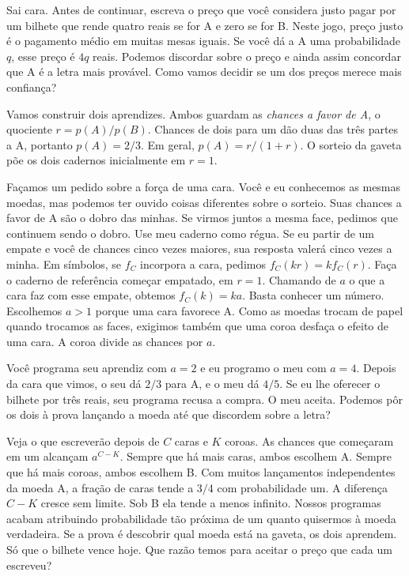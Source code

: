 \documentclass[12pt,oneside]{article}
\begin{document}
Sai cara. Antes de continuar, escreva o preço que você considera justo pagar por um bilhete que rende quatro reais se for A e zero se for B. Neste jogo, preço justo é o pagamento médio em muitas mesas iguais. Se você dá a A uma probabilidade \(q\), esse preço é \(4q\) reais. Podemos discordar sobre o preço e ainda assim concordar que A é a letra mais provável. Como vamos decidir se um dos preços merece mais confiança?

Vamos construir dois aprendizes. Ambos guardam as \emph{chances a favor de A}, o quociente \(r=p(A)/p(B)\). Chances de dois para um dão duas das três partes a A, portanto \(p(A)=2/3\). Em geral, \(p(A)=r/(1+r)\). O sorteio da gaveta põe os dois cadernos inicialmente em \(r=1\).

Façamos um pedido sobre a força de uma cara. Você e eu conhecemos as mesmas moedas, mas podemos ter ouvido coisas diferentes sobre o sorteio. Suas chances a favor de A são o dobro das minhas. Se virmos juntos a mesma face, pedimos que continuem sendo o dobro. Use meu caderno como régua. Se eu partir de um empate e você de chances cinco vezes maiores, sua resposta valerá cinco vezes a minha. Em símbolos, se $f_C$ incorpora a cara, pedimos $f_C(kr)=kf_C(r)$. Faça o caderno de referência começar empatado, em $r=1$. Chamando de $a$ o que a cara faz com esse empate, obtemos $f_C(k)=ka$. Basta conhecer um número. Escolhemos \(a>1\) porque uma cara favorece A. Como as moedas trocam de papel quando trocamos as faces, exigimos também que uma coroa desfaça o efeito de uma cara. A coroa divide as chances por \(a\).

Você programa seu aprendiz com \(a=2\) e eu programo o meu com \(a=4\). Depois da cara que vimos, o seu dá \(2/3\) para A, e o meu dá \(4/5\). Se eu lhe oferecer o bilhete por três reais, seu programa recusa a compra. O meu aceita. Podemos pôr os dois à prova lançando a moeda até que discordem sobre a letra?

Veja o que escreverão depois de \(C\) caras e \(K\) coroas. As chances que começaram em um alcançam \(a^{C-K}\). Sempre que há mais caras, ambos escolhem A. Sempre que há mais coroas, ambos escolhem B. Com muitos lançamentos independentes da moeda A, a fração de caras tende a \(3/4\) com probabilidade um. A diferença \(C-K\) cresce sem limite. Sob B ela tende a menos infinito. Nossos programas acabam atribuindo probabilidade tão próxima de um quanto quisermos à moeda verdadeira. Se a prova é descobrir qual moeda está na gaveta, os dois aprendem. Só que o bilhete vence hoje. Que razão temos para aceitar o preço que cada um escreveu?
\end{document}
